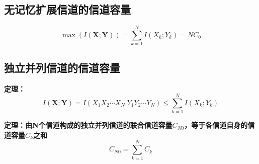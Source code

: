 \documentclass[UTF8]{ctexart} %
\begin{document}
		\subsection{无记忆扩展信道的信道容量}	
			\[\max(I(\bm{X;Y}))=\sum_{k=1}^{N}I(X_k;Y_k)=NC_0\]
			
		\subsection{独立并列信道的信道容量}	
			\textbf{定理：}
			\[I(\bm{X;Y}) = I(X_1X_2\cdots X_N|Y_1Y_2\cdots Y_N)\leq\sum_{k=1}^{N}I(X_k;Y_k)\]
			
			\textbf{定理：由N个信道构成的独立并列信道的联合信道容量$C_{N0}$，等于各信道自身的信道容量$C_k$之和}
			\[C_{N0} = \sum_{k=1}^NC_k\]
		
\end{document}
